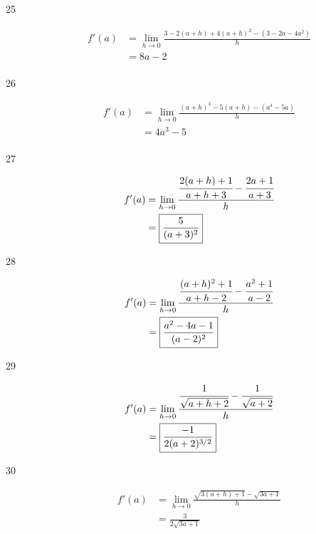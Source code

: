 \documentclass[letterpaper, landscape]{exam}
\begin{document}
\begin{description}
      \item[25]
        \begin{align*}
          f'(a) & =\lim_{h \to 0} \frac{3 - 2(a + h) + 4 \left( a + h \right)^2 - \left( 3 - 2a - 4a^2 \right)}{h} \\
                & = \boxed{ 8a - 2 } \\
        \end{align*}

      \item[26]
        \begin{align*}
          f'(a) & = \lim_{h \to 0} \frac{ (a + h)^4 - 5(a + h) - \left( a^4 - 5a \right)}{h} \\
                & = \boxed{ 4a^3 - 5 } \\
        \end{align*}
 
      \item[27]
        \begin{align*}
          f'(a) & = \lim_{h \to 0} \frac{ \cfrac{2(a + h) + 1}{a + h + 3} - \cfrac{2a + 1}{a + 3}}{h} \\
                & = \boxed{ \frac{5}{(a + 3)^2} } \\
        \end{align*}
 
      \item[28]
        \begin{align*}
          f'(a) & = \lim_{h \to 0} \frac{ \cfrac{(a + h)^2 + 1}{a + h - 2} - \cfrac{a^2 + 1}{a - 2}}{h} \\
                & = \boxed{ \frac{a^2 - 4a - 1}{(a - 2)^2} } \\
        \end{align*}

      \item[29]
        \begin{align*}
          f'(a) & = \lim_{h \to 0} \frac{ \cfrac{1}{\sqrt{a + h + 2}} - \cfrac{1}{\sqrt{a + 2}}}{h} \\
                & = \boxed{ \frac{-1}{2(a + 2)^{3/2}} } \\
        \end{align*}

      \item[30]
        \begin{align*}
          f'(a) & = \lim_{h \to 0} \frac{ \sqrt{3(a + h) + 1} - \sqrt{3a + 1} }{h} \\
                & = \boxed{ \frac{3}{2 \sqrt{3a + 1}} } \\
        \end{align*}


\end{description}
\end{document}
